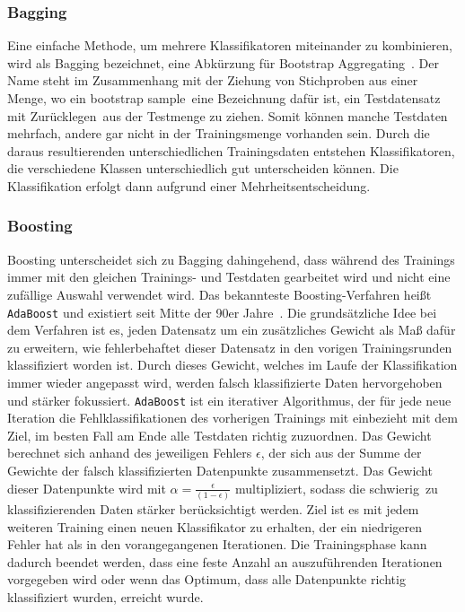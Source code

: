 \subsubsection{Bagging}
Eine einfache Methode, um mehrere Klassifikatoren miteinander zu kombinieren, wird als Bagging bezeichnet, eine Abkürzung für Bootstrap Aggregating~\cite{Breiman96baggingpredictors}. Der Name steht im Zusammenhang mit der Ziehung von Stichproben aus einer Menge, wo ein \glqq bootstrap sample\grqq\ eine Bezeichnung dafür ist, ein Testdatensatz \glqq mit Zurücklegen\grqq\ aus der Testmenge zu ziehen. Somit können manche Testdaten mehrfach, andere gar nicht in der Trainingsmenge vorhanden sein. Durch die daraus resultierenden unterschiedlichen Trainingsdaten entstehen Klassifikatoren, die verschiedene Klassen unterschiedlich gut unterscheiden können. Die Klassifikation erfolgt dann aufgrund einer Mehrheitsentscheidung.

\subsubsection{Boosting}
Boosting unterscheidet sich zu Bagging dahingehend, dass während des Trainings immer mit den gleichen Trainings- und Testdaten gearbeitet wird und nicht eine zufällige Auswahl verwendet wird.
Das bekannteste Boosting-Verfahren heißt \texttt{AdaBoost} und existiert seit Mitte der 90er Jahre~\cite{Freund95adecision-theoretic}. Die grundsätzliche Idee bei dem Verfahren ist es, jeden Datensatz um ein zusätzliches Gewicht als Maß dafür zu erweitern, wie fehlerbehaftet dieser Datensatz in den vorigen Trainingsrunden klassifiziert worden ist. Durch dieses Gewicht, welches im Laufe der Klassifikation immer wieder angepasst wird, werden falsch klassifizierte Daten hervorgehoben und stärker fokussiert. \texttt{AdaBoost} ist ein iterativer Algorithmus, der für jede neue Iteration die Fehlklassifikationen des vorherigen Trainings mit einbezieht mit dem Ziel, im besten Fall am Ende alle Testdaten richtig zuzuordnen. Das Gewicht berechnet sich anhand des jeweiligen Fehlers $\epsilon$, der sich aus der Summe der Gewichte der falsch klassifizierten Datenpunkte zusammensetzt. Das Gewicht dieser Datenpunkte wird mit
$ \alpha = \frac{\epsilon}{(1-\epsilon)} $ 
multipliziert, sodass die \glqq schwierig\grqq\ zu klassifizierenden Daten stärker berücksichtigt werden. Ziel ist es mit jedem weiteren Training einen neuen Klassifikator zu erhalten, der ein niedrigeren Fehler hat als in den vorangegangenen Iterationen. Die Trainingsphase kann dadurch beendet werden, dass eine feste Anzahl an auszuführenden Iterationen vorgegeben wird oder wenn das Optimum, dass alle Datenpunkte richtig klassifiziert wurden, erreicht wurde.

